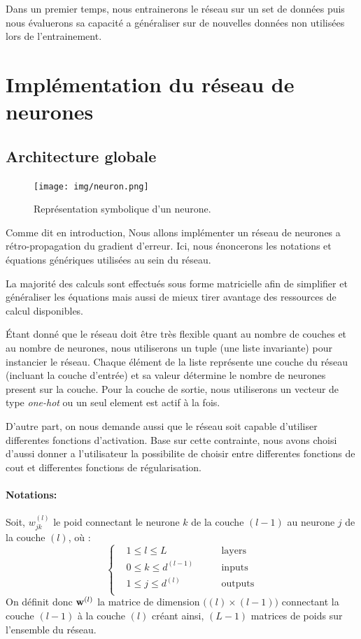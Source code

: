 \documentclass[11pt]{article}
\begin{document}
Dans un premier temps, nous entrainerons le r\'eseau sur un set de donn\'ees puis
nous \'evaluerons sa capacit\'e a g\'en\'eraliser sur de nouvelles donn\'ees non utilis\'ees
lors de l'entrainement.

\section{Impl\'ementation du r\'eseau de neurones}
\subsection{Architecture globale}
\begin{figure}[htp]
	\centering
	\texttt{[image: img/neuron.png]}
	\caption{Repr\'esentation symbolique d'un neurone.}
\end{figure}

Comme dit en introduction, Nous allons impl\'ementer un r\'eseau de neurones a
r\'etro-propagation du gradient d'erreur. Ici, nous \'enoncerons les notations et
\'equations g\'en\'eriques utilis\'ees au sein du r\'eseau.

La majorit\'e des calculs sont effectu\'es sous forme matricielle afin de simplifier
et g\'en\'eraliser les \'equations mais aussi de mieux tirer avantage des ressources
de calcul disponibles.

\'Etant donn\'e que le r\'eseau doit \^etre tr\`es flexible quant au nombre de
couches et au nombre de neurones, nous utiliserons un tuple (une liste
invariante) pour instancier le r\'eseau.
Chaque \'el\'ement de la liste repr\'esente une couche du r\'eseau
(incluant la couche d'entr\'ee) et sa valeur d\'etermine le nombre de neurones
present sur la couche.
Pour la couche de sortie, nous utiliserons un vecteur de
type \emph{one-hot} ou un seul element est actif \`a la fois.

D'autre part, on nous demande aussi que le r\'eseau soit capable d'utiliser
differentes fonctions d'activation. Base sur cette contrainte, nous avons
choisi d'aussi donner a l'utilisateur la possibilite de choisir entre
differentes fonctions de cout et differentes fonctions de r\'egularisation.

\paragraph{Notations: }Soit, $w_{jk}^{(l)}$ le poid connectant le neurone $k$
de la couche $(l-1)$ au neurone $j$ de la couche $(l)$, o\`u :
$$
\left \{
	\begin{aligned}
		&1 \le l \le L         &\qquad \text{layers} \\
		&0 \le k \le d^{(l-1)} &\qquad \text{inputs} \\
		&1 \le j \le d^{(l)}   &\qquad \text{outputs}\\
	\end{aligned}
\right .
$$
On d\'efinit donc ${\bf w}^{(l)}$ la matrice de dimension $\Big((l) \times (l-1)\Big)$
connectant la couche $(l-1)$ \`a la couche $(l)$ cr\'eant ainsi, $(L-1)$ matrices
de poids sur l'ensemble du r\'eseau. \\
\end{document}
